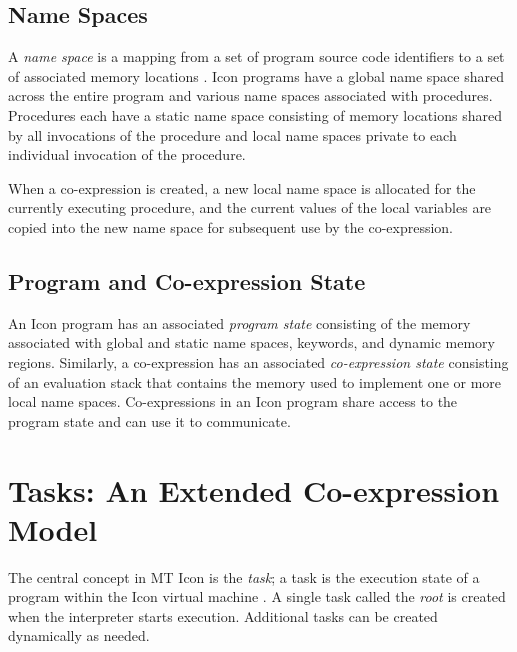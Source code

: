 \subsection{Name Spaces}


A {\em name space\/} is a mapping from a set of program source code
identifiers to a set of associated memory locations \cite{Abelson85}.
Icon programs have a global name space shared across the entire
program and various name spaces associated with procedures.
Procedures each have a static name space consisting of memory
locations shared by all invocations of the procedure and local name
spaces private to each individual invocation of the procedure.

When a co-expression is created, a new local name space is allocated
for the currently executing procedure, and the current values of the
local variables are copied into the new name space for subsequent use
by the co-expression.

\subsection{Program and Co-expression State}


An Icon program has an associated {\em program state\/} consisting of
the memory associated with global and static name spaces, keywords,
and dynamic memory regions.  Similarly, a co-expression has an
associated {\em co-expression state\/} consisting of an evaluation
stack that contains the memory used to implement one or more local
name spaces.   Co-expressions in an Icon program share access to the
program state and can use it to communicate.

\section{Tasks: An Extended Co-expression Model}

The central concept in MT Icon is the {\em task\/}; a task is
the execution state of a program within the Icon virtual machine
\cite{Griswold86}.  A single task called the {\em root\/} is created
when the interpreter starts execution. Additional tasks can be created
dynamically as needed.

